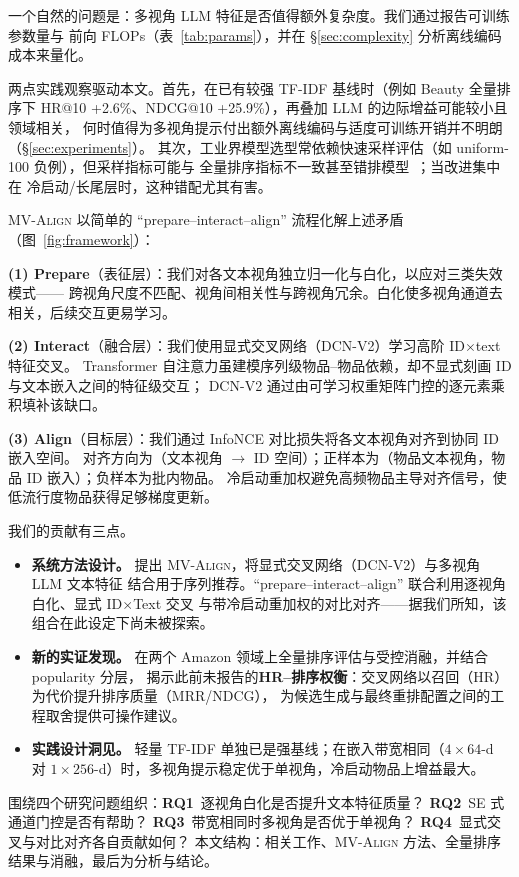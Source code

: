 \documentclass[sigconf,natbib=true,anonymous]{acmart}
\newcommand{\model}{\textsc{MV-Align}\xspace}
\newcommand{\tfidf}{\textsc{TF-IDF}\xspace}
\newcommand{\llm}{\textsc{LLM}\xspace}
\begin{document}
一个自然的问题是：多视角 \llm 特征是否值得额外复杂度。我们通过报告可训练参数量与
前向 FLOPs（表~\ref{tab:params}），并在 \S\ref{sec:complexity} 分析离线编码成本来量化。

两点实践观察驱动本文。首先，在已有较强 \tfidf 基线时（例如 Beauty 全量排序下
HR@10 +2.6\%、NDCG@10 +25.9\%），再叠加 \llm 的边际增益可能较小且领域相关，
何时值得为多视角提示付出额外离线编码与适度可训练开销并不明朗（\S\ref{sec:experiments}）。
其次，工业界模型选型常依赖快速采样评估（如 uniform-100 负例），但采样指标可能与
全量排序指标不一致甚至错排模型~\cite{krichene2020sampledmetrics}；当改进集中在
冷启动/长尾层时，这种错配尤其有害。

\model 以简单的 ``prepare--interact--align'' 流程化解上述矛盾（图~\ref{fig:framework}）：

\textbf{(1) Prepare}（表征层）：我们对各文本视角独立归一化与白化，以应对三类失效模式——
跨视角尺度不匹配、视角间相关性与跨视角冗余。白化使多视角通道去相关，后续交互更易学习。

\textbf{(2) Interact}（融合层）：我们使用显式交叉网络（DCN-V2）学习高阶 ID$\times$text 特征交叉。
Transformer 自注意力虽建模序列级物品--物品依赖，却不显式刻画 ID 与文本嵌入之间的特征级交互；
DCN-V2 通过由可学习权重矩阵门控的逐元素乘积填补该缺口。

\textbf{(3) Align}（目标层）：我们通过 InfoNCE 对比损失将各文本视角对齐到协同 ID 嵌入空间。
对齐方向为（文本视角 $\to$ ID 空间）；正样本为（物品文本视角，物品 ID 嵌入）；负样本为批内物品。
\mbox{冷启动}重加权避免高频物品主导对齐信号，使低流行度物品获得足够梯度更新。

我们的贡献有三点。
\begin{itemize}[leftmargin=*,itemsep=1pt]
  \item \textbf{系统方法设计。} 提出 \model，将显式交叉网络（DCN-V2）与多视角 \llm 文本特征
    结合用于序列推荐。``prepare--interact--align'' 联合利用逐视角白化、显式 ID$\times$Text 交叉
    与带冷启动重加权的对比对齐——据我们所知，该组合在此设定下尚未被探索。
  \item \textbf{新的实证发现。} 在两个 Amazon 领域上全量排序评估与受控消融，并结合 popularity 分层，
    揭示此前未报告的\textbf{HR--排序权衡}：交叉网络以召回（HR）为代价提升排序质量（MRR/NDCG），
    为候选生成与最终重排配置之间的工程取舍提供可操作建议。
  \item \textbf{实践设计洞见。} 轻量 \tfidf 单独已是强基线；在嵌入带宽相同（$4{\times}64$-d 对
    $1{\times}256$-d）时，多视角提示稳定优于单视角，冷启动物品上增益最大。
\end{itemize}
围绕四个研究问题组织：\textbf{RQ1}~逐视角白化是否提升文本特征质量？
\textbf{RQ2}~SE 式通道门控是否有帮助？
\textbf{RQ3}~带宽相同时多视角是否优于单视角？
\textbf{RQ4}~显式交叉与对比对齐各自贡献如何？
本文结构：相关工作、\model 方法、全量排序结果与消融，最后为分析与结论。
\end{document}
